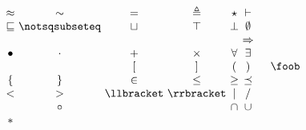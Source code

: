 \documentclass{article}
\begin{document}
\[
\begin{array}{cc}
\begin{array}{c@{~}c@{~}c@{~}c@{~}c@{~}c}
\approx & \sim  &  = & \triangleq & \star & \vdash \\
\sqsubseteq & \notsqsubseteq & \sqcup & \top & \bot & \emptyset \\
\uparrow & \rightarrow & \leftrightarrow & \leadsto & \mapsto & \Rightarrow \\
\bullet & \cdot & + & \times & \forall & \exists \\
\langle & \rangle & [ & ] & ( & ) \\
\{& \} & \in & \leq & \geq & \preceq \\ 
< & > & \llbracket & \rrbracket & | & / \\
\backslash & \circ & \longrightarrow & \implies & \cap & \cup \\
{*} \\
\end{array}
& 
\foob
\end{array}
\]
\end{document}
